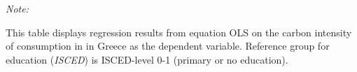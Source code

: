 \begin{table}[htbp!]
\begin{adjustbox}{width = 1\textwidth, max height = 0.95\textheight, center}
\begin{threeparttable}[b]
         \begin{tablenotes}\item \medskip \textit{Note:}
            \item This table displays regression results from equation OLS on the carbon intensity of consumption in  in Greece as the dependent variable. Reference group for education (\textit{ISCED}) is ISCED-level 0-1 (primary or no education).
         \end{tablenotes}
      \end{threeparttable}
   \end{adjustbox}
\end{table}


